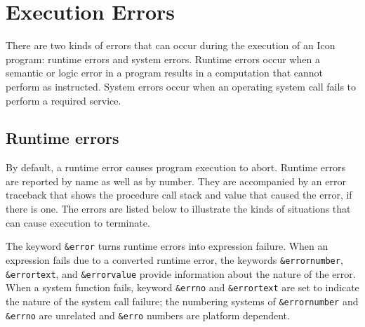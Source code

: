 \section{Execution Errors}

There are two kinds of errors that can occur during the execution of an
Icon program: runtime errors and system errors. Runtime errors occur
when a semantic or logic error in a program results in a computation
that cannot perform as instructed. System errors occur when an
operating system call fails to perform a
required service.

\subsection*{Runtime errors}

By default, a runtime error causes program
execution to abort. Runtime errors are reported by name as well as by
number. They are accompanied by an error traceback that shows the
procedure call stack and value that caused the error, if there is one.
The errors are listed below to illustrate the kinds of situations that
can cause execution to terminate.

The keyword \texttt{\&error} turns runtime errors into
expression failure. When an expression fails due to a converted runtime
error, the keywords \texttt{\&errornumber}, \texttt{\&errortext}, and
\texttt{\&errorvalue} provide information about the nature of the
error. When a system function fails, keyword \texttt{\&errno} and
\texttt{\&errortext} are set to indicate the nature of the
system call failure; the numbering systems of \texttt{\&errornumber}
and \texttt{\&errno} are unrelated and \texttt{\&erro} numbers are
platform dependent.

